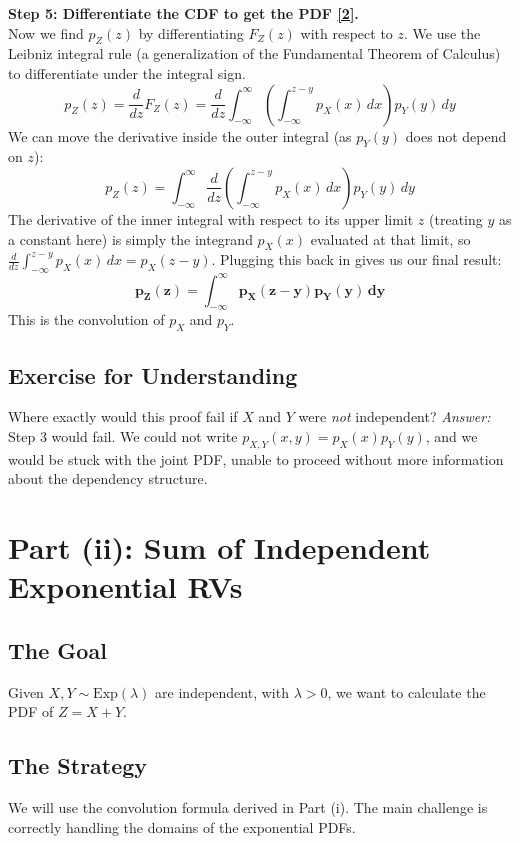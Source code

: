 \documentclass[11pt,a4paper]{article}
\begin{document}
\noindent\textbf{Step 5: Differentiate the CDF to get the PDF \hyperlink{note_leibniz}{[2]}.} \\
Now we find $p_Z(z)$ by differentiating $F_Z(z)$ with respect to $z$. We use the Leibniz integral rule (a generalization of the Fundamental Theorem of Calculus) to differentiate under the integral sign.
\[
p_Z(z) = \frac{d}{dz} F_Z(z) = \frac{d}{dz} \int_{-\infty}^{\infty} \left( \int_{-\infty}^{z-y} p_X(x) \, dx \right) p_Y(y) \, dy
\]
We can move the derivative inside the outer integral (as $p_Y(y)$ does not depend on $z$):
\[
p_Z(z) = \int_{-\infty}^{\infty} \frac{d}{dz} \left( \int_{-\infty}^{z-y} p_X(x) \, dx \right) p_Y(y) \, dy
\]
The derivative of the inner integral with respect to its upper limit $z$ (treating $y$ as a constant here) is simply the integrand $p_X(x)$ evaluated at that limit, so $\frac{d}{dz} \int_{-\infty}^{z-y} p_X(x) \, dx = p_X(z-y)$.
Plugging this back in gives us our final result:
\[
\mathbf{p_Z(z) = \int_{-\infty}^{\infty} p_X(z-y) p_Y(y) \, dy}
\]
This is the convolution of $p_X$ and $p_Y$.

\subsection*{Exercise for Understanding}
Where exactly would this proof fail if $X$ and $Y$ were \textit{not} independent?
\textit{Answer:} Step 3 would fail. We could not write $p_{X,Y}(x,y) = p_X(x) p_Y(y)$, and we would be stuck with the joint PDF, unable to proceed without more information about the dependency structure.

\section{Part (ii): Sum of Independent Exponential RVs}

\subsection{The Goal}
Given $X, Y \sim \text{Exp}(\lambda)$ are independent, with $\lambda > 0$, we want to calculate the PDF of $Z = X+Y$.

\subsection{The Strategy}
We will use the convolution formula derived in Part (i). The main challenge is correctly handling the domains of the exponential PDFs.
\end{document}
